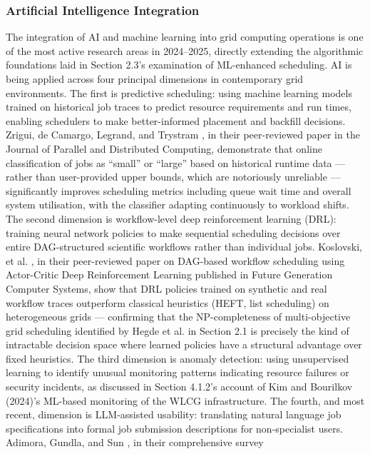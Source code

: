\documentclass[12pt,a4paper]{report}
\begin{document}
\subsubsection{Artificial Intelligence Integration}
The integration of AI and machine learning into grid computing operations is one of the most active research areas in 2024–2025, directly extending 
the algorithmic foundations laid in Section 2.3’s examination of ML-enhanced scheduling. AI is being applied across four principal dimensions in 
contemporary grid environments. The first is predictive scheduling: using machine learning models trained on historical job traces to predict resource 
requirements and run times, enabling schedulers to make better-informed placement and backfill decisions. Zrigui, de Camargo, Legrand, and Trystram \parencite{zrigui2022online},
 in their peer-reviewed paper in the Journal of Parallel and Distributed Computing, demonstrate that online classification of jobs as “small” or “large” 
 based on historical runtime data — rather than user-provided upper bounds, which are notoriously unreliable — significantly improves scheduling metrics 
 including queue wait time and overall system utilisation, with the classifier adapting continuously to workload shifts. The second dimension is 
 workflow-level deep reinforcement learning (DRL): training neural network policies to make sequential scheduling decisions over entire DAG-structured 
 scientific workflows rather than individual jobs. Koslovski, et al. \parencite{koslovski2024}, in their peer-reviewed paper on DAG-based workflow
  scheduling using Actor-Critic Deep Reinforcement Learning published in Future Generation Computer Systems, show that DRL policies trained on synthetic
   and real workflow traces outperform classical heuristics (HEFT, list scheduling) on heterogeneous grids — confirming that the NP-completeness of 
   multi-objective grid scheduling identified by Hegde et al. \parencite{hegde2024} in Section 2.1 is precisely the kind of intractable decision space where learned 
   policies have a structural advantage over fixed heuristics. The third dimension is anomaly detection: using unsupervised learning to identify unusual
    monitoring patterns indicating resource failures or security incidents, as discussed in Section 4.1.2’s account of Kim and Bourilkov (2024)’s ML-based
     monitoring of the WLCG infrastructure. The fourth, and most recent, dimension is LLM-assisted usability: translating natural language job
      specifications into formal job submission descriptions for non-specialist users. Adimora, Gundla, and Sun \parencite{adimora2025hpc}, in their comprehensive survey 
\end{document}
